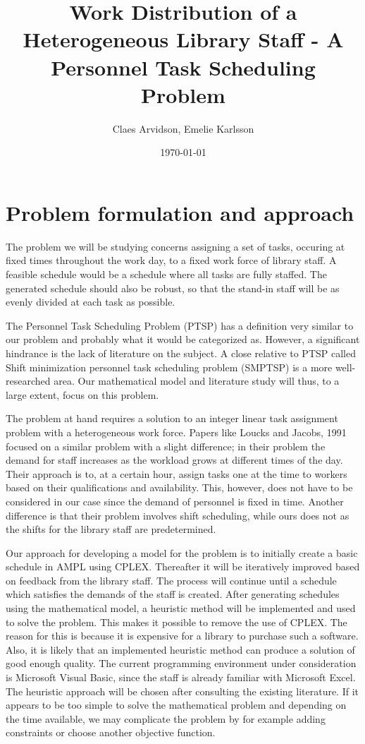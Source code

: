 \documentclass{article}
\title{Work Distribution of a Heterogeneous Library Staff - A Personnel Task Scheduling Problem}
\author{Claes Arvidson, Emelie Karlsson}
\date{\today}
\begin{document}
 
\maketitle
\pagebreak
 
\section*{Problem formulation and approach}
The problem we will be studying concerns assigning a set of tasks, occuring at fixed times throughout the work day, to a fixed work force of library staff. A feasible schedule would be a schedule where all tasks are fully staffed. The generated schedule should also be robust, so that the stand-in staff will be as evenly divided at each task as possible.

The Personnel Task Scheduling Problem (PTSP) has a definition very similar to our problem and probably what it would be categorized as. However, a significant hindrance is the lack of literature on the subject. A close relative to PTSP called Shift minimization personnel task scheduling problem (SMPTSP) is a more well-researched area. Our mathematical model and literature study will thus, to a large extent, focus on this problem.

The problem at hand requires a solution to an integer linear task assignment problem with a heterogeneous work force. Papers like Loucks and Jacobs, 1991 focused on a similar problem with a slight difference; in their problem the demand for staff increases as the workload grows at different times of the day. Their approach is to, at a certain hour, assign tasks one at the time to workers based on their qualifications and availability. This, however, does not have to be considered in our case since the demand of personnel is fixed in time. Another difference is that their problem involves shift scheduling, while ours does not as the shifts for the library staff are predetermined.

Our approach for developing a model for the problem is to initially create a basic schedule in AMPL using CPLEX. Thereafter it will be iteratively improved based on feedback from the library staff. The process will continue until a schedule which satisfies the demands of the staff is created. After generating schedules using the mathematical model, a heuristic method will be implemented and used to solve the problem. This makes it possible to remove the use of CPLEX. The reason for this is because it is expensive for a library to purchase such a software. Also, it is likely that an implemented heuristic method can produce a solution of good enough quality. The current programming environment under consideration is Microsoft Visual Basic, since the staff is already familiar with Microsoft Excel. The heuristic approach will be chosen after consulting the existing literature. If it appears to be too simple to solve the mathematical problem and depending on the time available, we may complicate the problem by for example adding constraints or choose another objective function.
\end{document}
